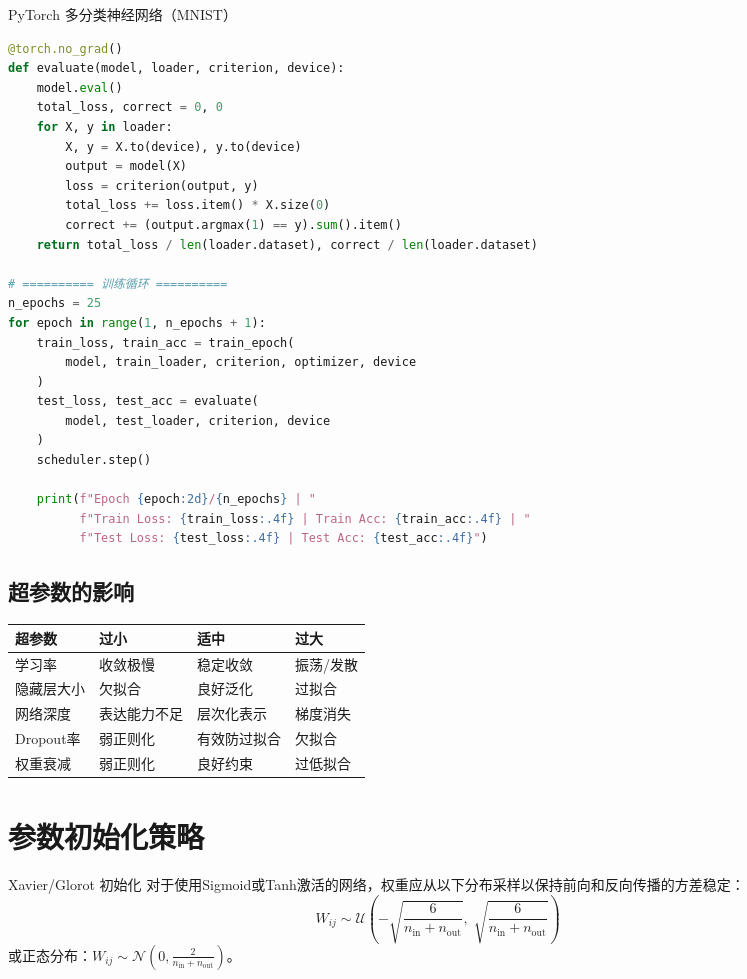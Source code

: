 \begin{mycode}{PyTorch 多分类神经网络（MNIST）}
\begin{lstlisting}[language=Python]
@torch.no_grad()
def evaluate(model, loader, criterion, device):
    model.eval()
    total_loss, correct = 0, 0
    for X, y in loader:
        X, y = X.to(device), y.to(device)
        output = model(X)
        loss = criterion(output, y)
        total_loss += loss.item() * X.size(0)
        correct += (output.argmax(1) == y).sum().item()
    return total_loss / len(loader.dataset), correct / len(loader.dataset)

# ========== 训练循环 ==========
n_epochs = 25
for epoch in range(1, n_epochs + 1):
    train_loss, train_acc = train_epoch(
        model, train_loader, criterion, optimizer, device
    )
    test_loss, test_acc = evaluate(
        model, test_loader, criterion, device
    )
    scheduler.step()

    print(f"Epoch {epoch:2d}/{n_epochs} | "
          f"Train Loss: {train_loss:.4f} | Train Acc: {train_acc:.4f} | "
          f"Test Loss: {test_loss:.4f} | Test Acc: {test_acc:.4f}")
\end{lstlisting}
\end{mycode}

\subsection{超参数的影响}

\begin{center}
\begin{tabular}{p{3cm}|p{3cm}|p{3cm}|p{3cm}}
\toprule
\textbf{超参数} & \textbf{过小} & \textbf{适中} & \textbf{过大} \\
\midrule
学习率 & 收敛极慢 & 稳定收敛 & 振荡/发散 \\
隐藏层大小 & 欠拟合 & 良好泛化 & 过拟合 \\
网络深度 & 表达能力不足 & 层次化表示 & 梯度消失 \\
Dropout率 & 弱正则化 & 有效防过拟合 & 欠拟合 \\
权重衰减 & 弱正则化 & 良好约束 & 过低拟合 \\
\bottomrule
\end{tabular}
\end{center}

\section{参数初始化策略}

\begin{myTheorem}{Xavier/Glorot 初始化}
对于使用Sigmoid或Tanh激活的网络，权重应从以下分布采样以保持前向和反向传播的方差稳定：
\[
W_{ij} \sim \mathcal{U}\!\left(-\sqrt{\frac{6}{n_{\text{in}} + n_{\text{out}}}},\; \sqrt{\frac{6}{n_{\text{in}} + n_{\text{out}}}}\right)
\]
或正态分布：$W_{ij} \sim \mathcal{N}\!\left(0, \frac{2}{n_{\text{in}} + n_{\text{out}}}\right)$。
\end{myTheorem}

